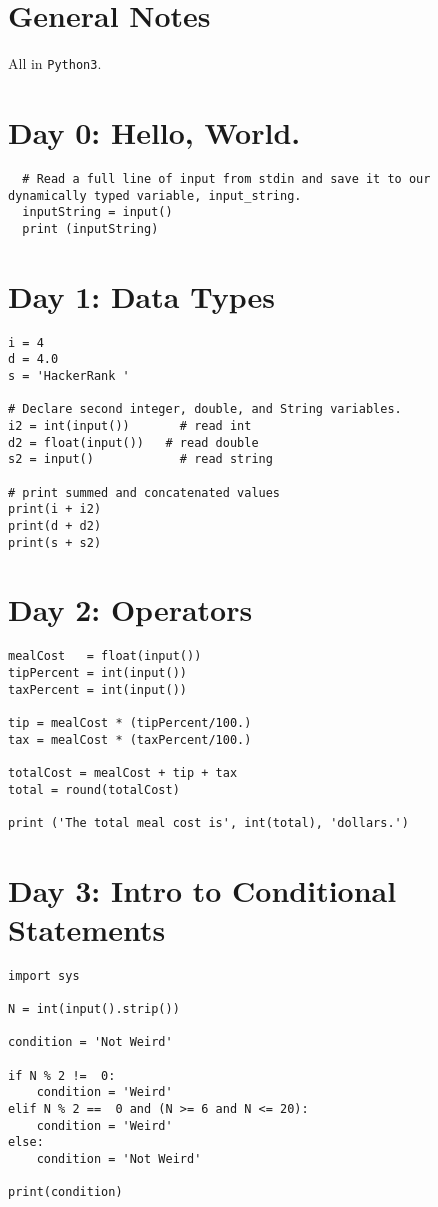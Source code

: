 \documentclass[11pt,a4paper]{article}
\begin{document}
\section*{General Notes}
All in {\tt Python3}. 

\newpage
\section{Day 0: Hello, World.}
\begin{lstlisting}
  # Read a full line of input from stdin and save it to our dynamically typed variable, input_string.
  inputString = input()
  print (inputString)
\end{lstlisting}

\newpage
\section{Day 1: Data Types}
\begin{lstlisting}
i = 4
d = 4.0
s = 'HackerRank '

# Declare second integer, double, and String variables.
i2 = int(input())       # read int
d2 = float(input())   # read double 
s2 = input()            # read string

# print summed and concatenated values
print(i + i2)
print(d + d2)
print(s + s2)
\end{lstlisting}

\newpage
\section{Day 2: Operators}
\begin{lstlisting}
mealCost   = float(input()) 
tipPercent = int(input())   
taxPercent = int(input()) 

tip = mealCost * (tipPercent/100.)
tax = mealCost * (taxPercent/100.)

totalCost = mealCost + tip + tax
total = round(totalCost)

print ('The total meal cost is', int(total), 'dollars.')
\end{lstlisting}


\newpage
\section{Day 3: Intro to Conditional Statements}
\begin{lstlisting}
import sys

N = int(input().strip())

condition = 'Not Weird' 

if N % 2 !=  0:
    condition = 'Weird'
elif N % 2 ==  0 and (N >= 6 and N <= 20):
    condition = 'Weird'
else:
    condition = 'Not Weird' 

print(condition)        

\end{lstlisting}
\end{document}

